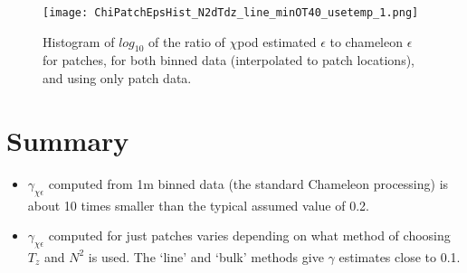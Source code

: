 \documentclass[11pt]{article}
\begin{document}
\begin{figure}[htbp]
\texttt{[image: ChiPatchEpsHist\_N2dTdz\_line\_minOT40\_usetemp\_1.png]}
\caption{Histogram of $log_{10}$ of the ratio of $\chi$pod estimated $\epsilon$ to chameleon $\epsilon$ for patches, for both binned data (interpolated to patch locations), and using only patch data.}
\label{epscomphist}
\end{figure}





\clearpage
\section{Summary}

\begin{itemize}
\item $\gamma_{\chi\epsilon}$ computed from 1m binned data (the standard Chameleon processing) is about 10 times smaller than the typical assumed value of 0.2.
\item $\gamma_{\chi\epsilon}$ computed for just patches varies depending on what method of choosing $T_z$ and $N^2$ is used. The `line' and `bulk' methods give $\gamma$ estimates close to 0.1. 
\end{itemize}
\end{document}
